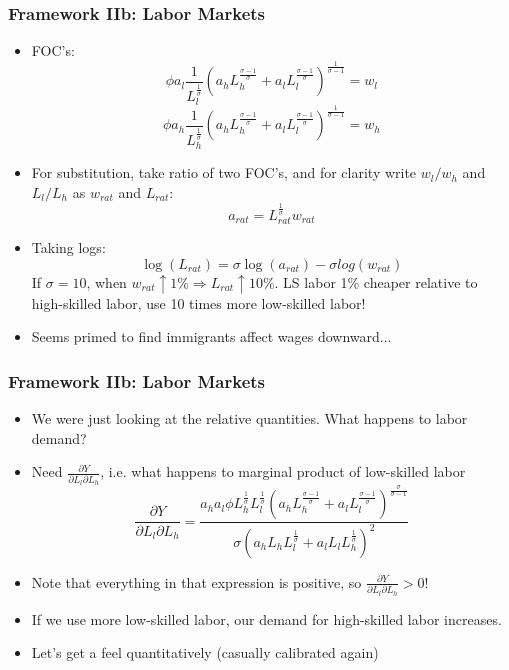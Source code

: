 \documentclass{beamer}
\begin{document}
\begin{frame}
\frametitle{Framework IIb: Labor Markets}
\begin{itemize}
\item FOC's:
$$\phi a_l\frac{1}{L_l^\frac{1}{\sigma}}\left(a_hL_h^\frac{\sigma-1}{\sigma}+a_lL_l^\frac{\sigma-1}{\sigma}\right)^\frac{1}{\sigma-1}=w_l$$
$$\phi a_h\frac{1}{L_h^\frac{1}{\sigma}}\left(a_hL_h^\frac{\sigma-1}{\sigma}+a_lL_l^\frac{\sigma-1}{\sigma}\right)^\frac{1}{\sigma-1}=w_h$$
\item For substitution, take ratio of two FOC's, and for clarity write $w_l/w_h$ and $L_l/L_h$ as $w_{rat}$ and $L_{rat}$:
$$a_{rat}=L_{rat}^\frac{1}{\sigma}w_{rat}$$
\item Taking logs:
$$\log(L_{rat})=\sigma\log(a_{rat})-\sigma log(w_{rat})$$
If $\sigma=10$, when $w_{rat}\uparrow1\%\Rightarrow L_{rat}\uparrow10\%$.  LS labor 1\% cheaper relative to high-skilled labor, use 10 times more low-skilled labor!
\item Seems primed to find immigrants affect wages downward...
\end{itemize}
\end{frame}

\begin{frame}
\frametitle{Framework IIb: Labor Markets}
\begin{itemize}
\item We were just looking at the relative quantities.  What happens to labor demand?  
\bigskip
\item Need $\frac{\partial Y}{\partial L_l\partial L_h}$, i.e. what happens to marginal product of low-skilled labor 
\bigskip
$$\frac{\partial Y}{\partial L_l\partial L_h}=\frac{a_h a_l \phi  L_h^{\frac{1}{\sigma }} L_l^{\frac{1}{\sigma }} \left(a_h L_h^{\frac{\sigma -1}{\sigma }}+a_l
   L_l^{\frac{\sigma -1}{\sigma }}\right)^{\frac{\sigma }{\sigma -1}}}{\sigma  \left(a_h L_h L_l^{\frac{1}{\sigma }}+a_l L_l
   L_h^{\frac{1}{\sigma }}\right)^2}$$
   \item Note that everything in that expression is positive, so $\frac{\partial Y}{\partial L_l\partial L_h}>0$!
\bigskip
\item If we use more low-skilled labor, our demand for high-skilled labor increases.
\bigskip
\item Let's get a feel quantitatively (casually calibrated again)
\end{itemize}
\end{frame}
\end{document}
